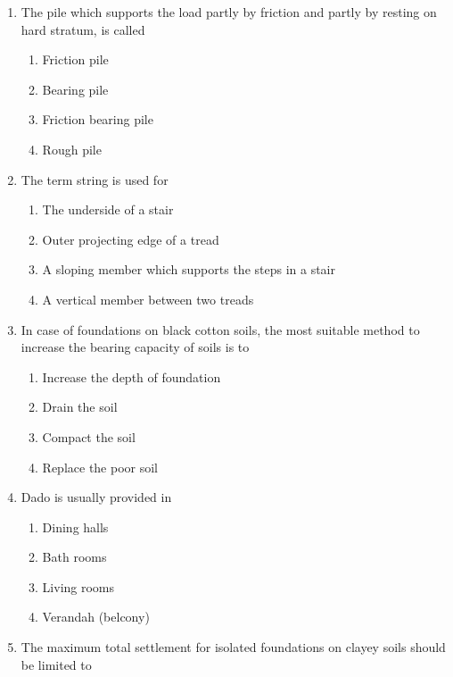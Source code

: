 \documentclass[11pt,a4paper]{article}
\begin{document}
\begin{enumerate}
\\
\item{The pile which supports the load partly by friction and partly by resting on hard stratum, is called}
\begin{enumerate}[label=\Alph*.]
\item{Friction pile}
\item{Bearing pile}
\item{Friction bearing pile}
\item{Rough pile}
\end{enumerate}
\item{The term string is used for}
\begin{enumerate}[label=\Alph*.]
\item{The underside of a stair}
\item{Outer projecting edge of a tread}
\item{A sloping member which supports the steps in a stair}
\item{A vertical member between two treads}
\end{enumerate}
\item{In case of foundations on black cotton soils, the most suitable method to increase the bearing capacity of soils is to}
\begin{enumerate}[label=\Alph*.]
\item{Increase the depth of foundation}
\item{Drain the soil}
\item{Compact the soil}
\item{Replace the poor soil}
\end{enumerate}
\item{Dado is usually provided in}
\begin{enumerate}[label=\Alph*.]
\item{Dining halls}
\item{Bath rooms}
\item{Living rooms}
\item{Verandah (belcony)}
\end{enumerate}
\item{The maximum total settlement for isolated foundations on clayey soils should be limited to}

\end{enumerate}
\end{document}
